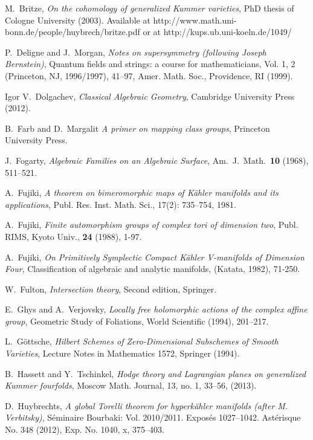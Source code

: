 \documentclass{alggeom}
\theoremstyle{plain}
\theoremstyle{definition}
\theoremstyle{remark}
\begin{document}
\begin{thebibliography}{10}
M.~Britze, \emph{On the cohomology of generalized Kummer varieties}, PhD thesis of Cologne University (2003). 
Available at http://www.math.uni-bonn.de/people/huybrech/britze.pdf or at http://kups.ub.uni-koeln.de/1049/

P.~Deligne and J.~Morgan, \emph{Notes on supersymmetry (following Joseph Bernstein)}, Quantum
fields and strings: a course for mathematicians, Vol. 1, 2 (Princeton, NJ, 1996/1997), 41--97,
Amer. Math. Soc., Providence, RI (1999).

Igor V.~Dolgachev, \emph{Classical Algebraic Geometry}, 
  Cambridge University Press (2012).

B.~Farb and D.~Margalit \emph{A primer on mapping class groups}, Princeton University Press.

J.~Fogarty, \emph{Algebraic Families on an Algebraic Surface},
  Am.~J.~Math.~\textbf{10} (1968), 511--521.

A.~Fujiki,
\emph{A theorem on bimeromorphic maps of K\"ahler manifolds and its applications},
Publ. Res. Inst. Math. Sci., 
17(2): 735--754, 1981.

A.~Fujiki, \emph{Finite automorphism groups of complex tori of dimension two}, Publ. RIMS,
  Kyoto Univ., \textbf{24} (1988), 1-97.

A.~Fujiki,
\emph{On Primitively Symplectic Compact K\"ahler V-manifolds of Dimension Four},
Classification of algebraic and analytic manifolds, 
(Katata, 1982), 71-250.

W.~Fulton,
\emph{Intersection theory},
Second edition, Springer.

E.~Ghys and A.~Verjovsky, \emph{Locally free holomorphic actions of the complex affine group},
  Geometric Study of Foliations, World Scientific (1994), 201--217.

L.~G\"ottsche, \emph{Hilbert Schemes of Zero-Dimensional Subschemes of Smooth Varieties},
  Lecture Notes in Mathematics 1572, Springer (1994).

B.~Hassett and Y.~Tschinkel, \emph{ Hodge theory and Lagrangian planes on 
  generalized Kummer fourfolds}, Moscow Math. Journal, 13, no. 1, 33--56, (2013).

D.~Huybrechts,
\emph{A global Torelli theorem for hyperk\"ahler manifolds (after M. Verbitsky)},
S\'eminaire Bourbaki: Vol. 2010/2011. Expos\'es 1027--1042. Ast\'erisque No. 348 (2012), Exp. No. 1040, x, 375--403.


\end{thebibliography}
\end{document}
